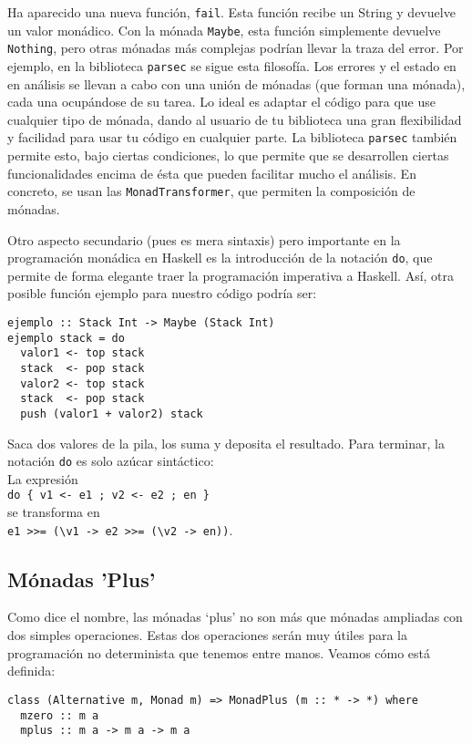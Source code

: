 \documentclass[class=article, crop=false]{standalone}
\begin{document}
Ha aparecido una nueva función, \verb`fail`. Esta función recibe un String y devuelve un
valor monádico. Con la mónada \verb`Maybe`, esta función simplemente devuelve \verb`Nothing`,
pero otras mónadas más complejas podrían llevar la traza del error. Por ejemplo, en la
biblioteca \verb`parsec` se sigue esta filosofía. Los errores y el estado en en análisis se
llevan a cabo con una unión de mónadas (que forman una mónada), cada una ocupándose de su
tarea. Lo ideal es adaptar el código para que use cualquier tipo de mónada, dando al usuario
de tu biblioteca una gran flexibilidad y facilidad para usar tu código en cualquier parte. La
biblioteca \verb`parsec` también permite esto, bajo ciertas condiciones, lo que permite que
se desarrollen ciertas funcionalidades encima de ésta que pueden facilitar mucho el análisis.
En concreto, se usan las \verb`MonadTransformer`, que permiten la composición de mónadas.

Otro aspecto secundario (pues es mera sintaxis) pero importante en la programación monádica
en Haskell es la introducción de la notación \verb`do`, que permite de forma elegante traer
la programación imperativa a Haskell. Así, otra posible función ejemplo para nuestro código
podría ser:

\begin{verbatim}
ejemplo :: Stack Int -> Maybe (Stack Int)
ejemplo stack = do
  valor1 <- top stack
  stack  <- pop stack
  valor2 <- top stack
  stack  <- pop stack
  push (valor1 + valor2) stack
\end{verbatim}

Saca dos valores de la pila, los suma y deposita el resultado. Para terminar, la notación
\verb`do` es solo azúcar sintáctico: \\
La expresión \\
\verb`do { v1 <- e1 ; v2 <- e2 ; en }` \\
se transforma en \\
\verb`e1 >>= (\v1 -> e2 >>= (\v2 -> en))`.

\subsection{Mónadas 'Plus'}
Como dice el nombre, las mónadas `plus' no son más que mónadas ampliadas con dos simples
operaciones. Estas dos operaciones serán muy útiles para la programación no determinista que
tenemos entre manos. Veamos cómo está definida:

\begin{verbatim}
class (Alternative m, Monad m) => MonadPlus (m :: * -> *) where
  mzero :: m a
  mplus :: m a -> m a -> m a
\end{verbatim}
\end{document}

